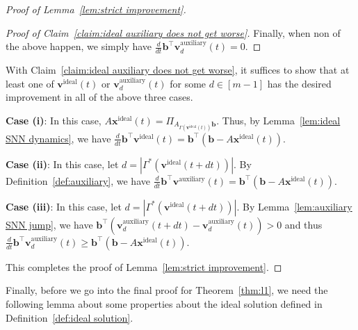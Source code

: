 \documentclass[11pt]{article}
\theoremstyle{remark}
\theoremstyle{definition}
\newcommand{\bx}{\mathbf{x}}
\newcommand{\bb}{\mathbf{b}}
\newcommand{\bv}{\mathbf{v}}
\begin{document}
\begin{proof}[Proof of Lemma~\ref{lem:strict improvement}]
\begin{proof}[Proof of Claim~\ref{claim:ideal auxiliary does not get worse}]
		Finally, when non of the above happen, we simply have  $\frac{d}{dt}\bb^\top\bv^\text{auxiliary}_d(t)=0$.
	\end{proof}
	With Claim~\ref{claim:ideal auxiliary does not get worse}, it suffices to show that at least one of $\bv^\text{ideal}(t)$ or $\bv^\text{auxiliary}_d(t)$ for some $d\in[m-1]$ has the desired improvement in all of the above three cases.
	
	\textbf{Case (i)}: In this case, $A\bx^\text{ideal}(t)=\Pi_{A_{\Gamma(\bv^\text{ideal}(t))}\bb}$. Thus, by Lemma~\ref{lem:ideal SNN dynamics}, we have $\frac{d}{dt}\bb^\top\bv^\text{ideal}(t)=\bb^\top\left(\bb-A\bx^\text{ideal}(t)\right)$.
	
	\textbf{Case (ii)}: In this case, let $d=|\Gamma^*(\bv^\text{ideal}(t+dt))|$. By Definition~\ref{def:auxiliary}, we have $\frac{d}{dt}\bb^\top\bv^\text{auxiliary}(t)=\bb^\top\left(\bb-A\bx^\text{ideal}(t)\right)$.
	
	\textbf{Case (iii)}: In this case, let $d=|\Gamma^*(\bv^\text{ideal}(t+dt))|$. By Lemma~\ref{lem:auxiliary SNN jump}, we have $\bb^\top\left(\bv^\text{auxiliary}_d(t+dt)-\bv^\text{auxiliary}_d(t)\right)>0$ and thus $\frac{d}{dt}\bb^\top\bv^\text{auxiliary}_d(t)\geq\bb^\top\left(\bb-A\bx^\text{ideal}(t)\right)$.
	
	This completes the proof of Lemma~\ref{lem:strict improvement}.
\end{proof}

Finally, before we go into the final proof for Theorem~\ref{thm:l1}, we need the following lemma about some properties about the ideal solution defined in Definition~\ref{def:ideal solution}.
\end{document}

